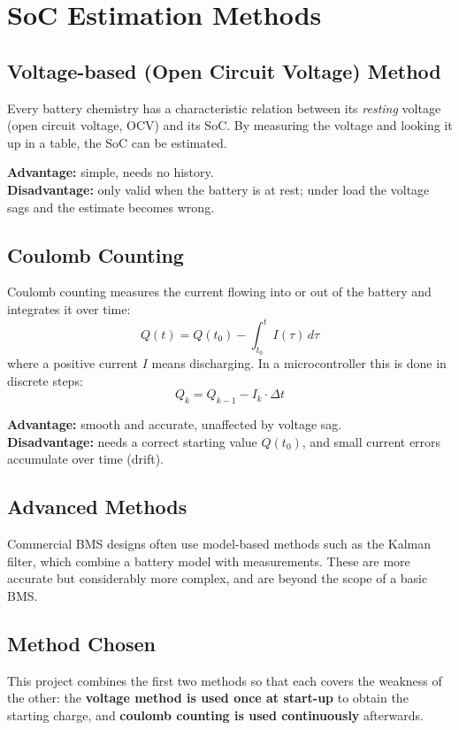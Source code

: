 \documentclass[12pt,a4paper,oneside]{report}
\begin{document}
\section{SoC Estimation Methods}

\subsection{Voltage-based (Open Circuit Voltage) Method}
Every battery chemistry has a characteristic relation between its \emph{resting} voltage (open circuit voltage, OCV) and its SoC. By measuring the voltage and looking it up in a table, the SoC can be estimated.

\textbf{Advantage:} simple, needs no history. \\
\textbf{Disadvantage:} only valid when the battery is at rest; under load the voltage sags and the estimate becomes wrong.

\subsection{Coulomb Counting}
Coulomb counting measures the current flowing into or out of the battery and integrates it over time:
\begin{equation}
  Q(t) = Q(t_0) - \int_{t_0}^{t} I(\tau)\, d\tau
\end{equation}
where a positive current $I$ means discharging. In a microcontroller this is done in discrete steps:
\begin{equation}
  Q_{k} = Q_{k-1} - I_k \cdot \Delta t
  \label{eq:cc}
\end{equation}

\textbf{Advantage:} smooth and accurate, unaffected by voltage sag. \\
\textbf{Disadvantage:} needs a correct starting value $Q(t_0)$, and small current errors accumulate over time (drift).

\subsection{Advanced Methods}
Commercial BMS designs often use model-based methods such as the Kalman filter, which combine a battery model with measurements. These are more accurate but considerably more complex, and are beyond the scope of a basic BMS.

\subsection{Method Chosen}
This project combines the first two methods so that each covers the weakness of the other: the \textbf{voltage method is used once at start-up} to obtain the starting charge, and \textbf{coulomb counting is used continuously} afterwards.
\end{document}
